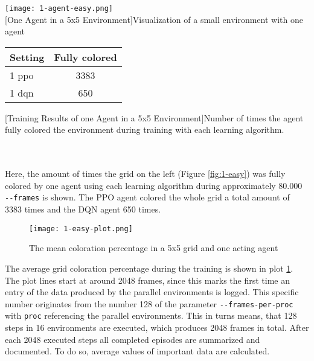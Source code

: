 \begin{minipage}{\textwidth}
  \begin{minipage}[b]{0.29\textwidth}
    \centering
    \texttt{[image: 1-agent-easy.png]}\\
    [One Agent in a 5x5 Environment]{Visualization of a small environment with one agent}\label{fig:1-easy}
  \end{minipage}
  \hfill
  \begin{minipage}[b]{0.69\textwidth}
    \centering
    \begin{tabular}{lc}\hline
      Setting & Fully colored \\ \hline
        1 ppo & 3383 \\
        1 dqn & 650 \\ \hline
      \end{tabular}
      [Training Results of one Agent in a 5x5 Environment]{Number of times the agent fully colored the environment during training with each learning algorithm. \\}\label{t:1-easy}
    \end{minipage}
  \end{minipage}\\\\

Here, the amount of times the grid on the left (Figure \ref{fig:1-easy}) was fully colored by one agent using each learning algorithm during approximately 80.000 \verb|--frames| is shown. The PPO agent colored the whole grid a total amount of 3383 times and the DQN agent 650 times.

\begin{figure}[hpbt]
    \centering
    \texttt{[image: 1-easy-plot.png]}\\
    \caption[Mean Coloration Percentage of one Agent in a 5x5 Environment]{The mean coloration percentage in a 5x5 grid and one acting agent}\label{fig:1-easy-plot}
\end{figure}

The average grid coloration percentage during the training is shown in plot \ref{fig:1-easy-plot}. The plot lines start at around 2048 frames, since this marks the first time an entry of the data produced by the parallel environments is logged. This specific number originates from the number 128 of the parameter \verb|--frames-per-proc| with \verb|proc| referencing the parallel environments. This in turns means, that 128 steps in 16 environments are executed, which produces 2048 frames in total. After each 2048 executed steps all completed episodes are summarized and documented. To do so, average values of important data are calculated. 

